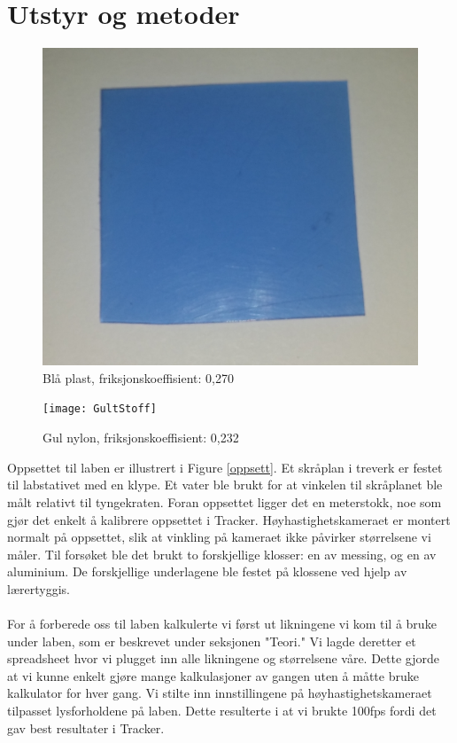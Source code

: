 \documentclass[10pt,a4paper]{report}
\begin{document}
\chapter*{Utstyr og metoder}
\begin{figure}[h!]
    \includegraphics[scale=0.05]{BlaaPlast}
    \caption{Blå plast, friksjonskoeffisient: 0,270}
    \label{fig:1}
\end{figure}
\begin{figure}[h!]
    \texttt{[image: GultStoff]}
    \caption{Gul nylon, friksjonskoeffisient: 0,232}
    \label{fig:2}
\end{figure}
Oppsettet til laben er illustrert i Figure \ref{oppsett}. Et skråplan i treverk er festet til labstativet med en klype. Et vater ble brukt for at vinkelen til skråplanet ble målt relativt til tyngekraten. Foran oppsettet ligger det en meterstokk, noe som gjør det enkelt å kalibrere oppsettet i Tracker. Høyhastighetskameraet er montert normalt på oppsettet, slik at vinkling på kameraet ikke påvirker størrelsene vi måler. Til forsøket ble det brukt to forskjellige klosser: en av messing, og en av aluminium. De forskjellige underlagene ble festet på klossene ved hjelp av lærertyggis.\\
\\For å forberede oss til laben kalkulerte vi først ut likningene vi kom til å bruke under laben, som er beskrevet under seksjonen "Teori." Vi lagde deretter et spreadsheet hvor vi plugget inn alle likningene og størrelsene våre. Dette gjorde at vi kunne enkelt gjøre mange kalkulasjoner av gangen uten å måtte bruke kalkulator for hver gang. Vi stilte inn innstillingene på høyhastighetskameraet tilpasset lysforholdene på laben. Dette resulterte i at vi brukte 100fps fordi det gav best resultater i Tracker.\\
\end{document}
